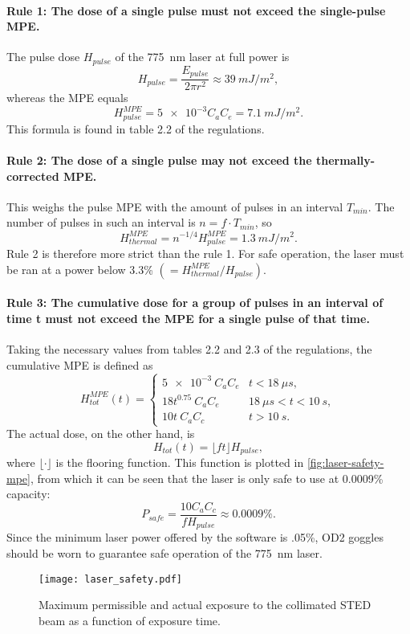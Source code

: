 \paragraph{Rule 1: The dose of a single pulse must not exceed the single-pulse MPE.} The pulse dose $ H_\mathit{pulse} $ of the 775~nm laser at full power is
\begin{equation}
	H_\mathit{pulse} = \frac{E_\mathit{pulse}}{2\pi r^2} \approx \SI{39}{mJ/m^2},
\end{equation}
whereas the MPE equals
\begin{equation}
	H_\mathit{pulse}^\mathit{MPE} = \num{5e-3} C_a C_e = \SI{7.1}{mJ/m^2}.
\end{equation}
This formula is found in table 2.2 of the regulations.

\paragraph{Rule 2: The dose of a single pulse may not exceed the thermally-corrected MPE.} This weighs the pulse MPE with the amount of pulses in an interval $ T_\mathit{min} $. The number of pulses in such an interval is $ n = f\cdot T_\mathit{min} $, so
\begin{equation}
	H_\mathit{thermal}^\mathit{MPE} =  n^{-1/4} H_\mathit{pulse}^\mathit{MPE} = \SI{1.3}{mJ/m^2}.
\end{equation}
Rule 2 is therefore more strict than the rule 1. For safe operation, the laser must be ran at a power below 3.3\% $ (=H^\mathit{MPE}_\mathit{thermal} / H_\mathit{pulse}) $.

\paragraph{Rule 3: The cumulative dose for a group of pulses in an interval of time t must not exceed the MPE for a single pulse of that time.} Taking the necessary values from tables 2.2 and 2.3 of the regulations, the cumulative MPE is defined as
\begin{equation}
	H_\mathit{tot}^\mathit{MPE}(t) = \left\{\begin{array}{rl}
		\num{5e-3} \:C_a C_e &  t<\SI{18}{\mu s,} \\
		18 t^{0.75} \:C_a C_e &  \SI{18}{\mu s} < t < \SI{10}{s}, \\
		10 t\:C_a C_c  &t> \SI{10}{s}.
	\end{array}\right.
\end{equation}
The actual dose, on the other hand, is
\begin{equation}
	H_\mathit{tot}(t) = \lfloor ft \rfloor H_\mathit{pulse},
\end{equation}
where $ \lfloor \cdot \rfloor$ is the flooring function. This function is plotted in \autoref{fig:laser-safety-mpe}, from which it can be seen that the laser is only safe to use at 0.0009\% capacity:
\begin{equation}
	P_\mathit{safe} = \frac{10C_aC_c}{fH_\mathit{pulse}} \approx 0.0009\%.
\end{equation} 
Since the minimum laser power offered by the software is .05\%, OD2 goggles should be worn to guarantee safe operation of the 775~nm laser.

\begin{figure}
	\centering
	\texttt{[image: laser\_safety.pdf]}
	\caption{Maximum permissible  and actual exposure to the collimated STED beam as a function of exposure time.}
	\label{fig:laser-safety-mpe}
\end{figure}